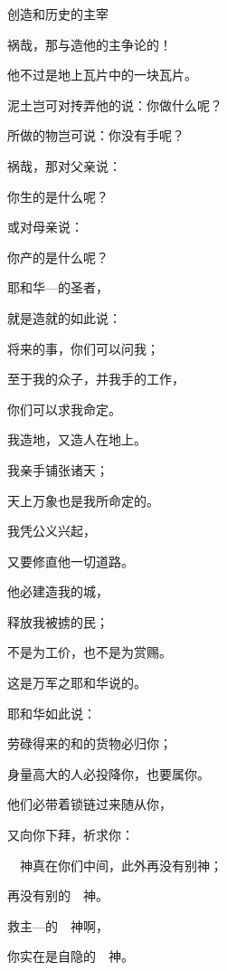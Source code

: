 {\par }{\SH 创造和历史的主宰
\par }{\Q {}祸哉，那与造他的主争论的！
\par }{\Q 他不过是地上瓦片中的一块瓦片。
\par }{\Q 泥土岂可对抟弄他的说：你做什么呢？
\par }{\Q 所做的物岂可说：你没有手呢？
\par }{\Q {}祸哉，那对父亲说：
\par }{\Q 你生的是什么呢？
\par }{\Q 或对母亲说：
\par }{\Q 你产的是什么呢？
\par }{\Q {}耶和华—{}的圣者，
\par }{\Q 就是造就{}的如此说：
\par }{\Q 将来的事，你们可以问我；
\par }{\Q 至于我的众子，并我手的工作，
\par }{\Q 你们可以求我命定。
\par }{\Q {}我造地，又造人在地上。
\par }{\Q 我亲手铺张诸天；
\par }{\Q 天上万象也是我所命定的。
\par }{\Q {}我凭公义兴起{}，
\par }{\Q 又要修直他一切道路。
\par }{\Q 他必建造我的城，
\par }{\Q 释放我被掳的民；
\par }{\Q 不是为工价，也不是为赏赐。
\par }{\Q 这是万军之耶和华说的。
\par }{\BB \par }{\Q {}耶和华如此说：
\par }{劳碌得来的和{}的货物必归你；
\par }{\Q 身量高大的{}人必投降你，也要属你。
\par }{\Q 他们必带着锁链过来随从你，
\par }{\Q 又向你下拜，祈求你{}：
\par }{\Q 　神真在你们中间，此外再没有别神；
\par }{\Q 再没有别的　神。
\par }{\Q {}救主—{}的　神啊，
\par }{\Q 你实在是自隐的　神。
}

